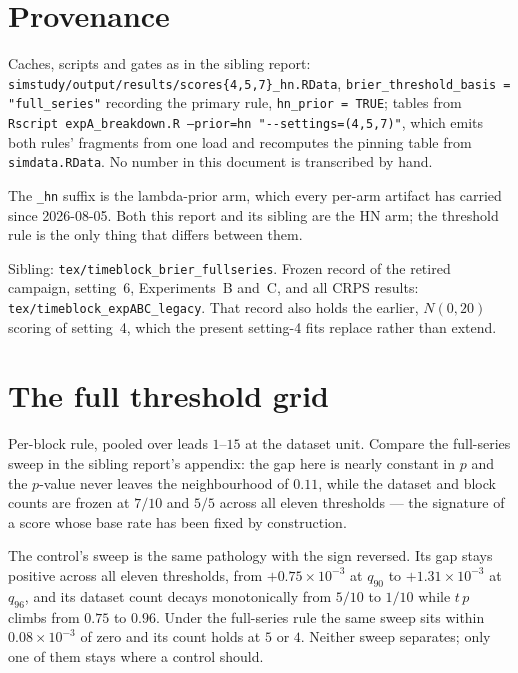 \documentclass[11pt]{article}
\newcommand{\code}[1]{\texttt{#1}}
\newcommand{\tblpath}{../../code/analysis/time_block_forecast/simstudy/output/tables}
\newcommand{\tbl}[1]{}
\begin{document}
\section{Provenance}

Caches, scripts and gates as in the sibling report:
\code{simstudy/output/results/scores\{4,5,7\}\_hn.RData},
\code{brier\_threshold\_basis = "full\_series"} recording the primary
rule, \code{hn\_prior = TRUE}; tables from
\code{Rscript expA\_breakdown.R --prior=hn "-{}-settings=(4,5,7)"}, which
emits both rules' fragments from one load and recomputes the pinning
table from \code{simdata.RData}. No number in this document is
transcribed by hand.

The \code{\_hn} suffix is the lambda-prior arm, which every per-arm
artifact has carried since 2026-08-05. Both this report and its sibling
are the HN arm; the threshold rule is the only thing that differs between
them.

Sibling: \code{tex/timeblock\_brier\_fullseries}. Frozen record of the
retired campaign, setting~6, Experiments~B and~C, and all CRPS results:
\code{tex/timeblock\_expABC\_legacy}. That record also holds the earlier,
$N(0, 20)$ scoring of setting~4, which the present setting-4 fits replace
rather than extend.

\appendix
\section{The full threshold grid}

\tbl{expA_qsweep_blockq}

\noindent Per-block rule, pooled over leads $1$--$15$ at the dataset
unit. Compare the full-series sweep in the sibling report's appendix: the
gap here is nearly constant in $p$ and the $p$-value never leaves the
neighbourhood of $0.11$, while the dataset and block counts are frozen at
$7/10$ and $5/5$ across all eleven thresholds --- the signature of a
score whose base rate has been fixed by construction.

The control's sweep is the same pathology with the sign reversed. Its
gap stays positive across all eleven thresholds, from
$+0.75 \times 10^{-3}$ at $q_{90}$ to $+1.31 \times 10^{-3}$ at
$q_{96}$, and its dataset count decays monotonically from $5/10$ to
$1/10$ while $t\,p$ climbs from $0.75$ to $0.96$. Under the full-series
rule the same sweep sits within $0.08 \times 10^{-3}$ of zero and its
count holds at $5$ or $4$. Neither sweep separates; only one of them
stays where a control should.
\end{document}
